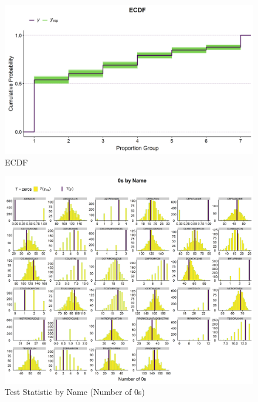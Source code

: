 \documentclass[11pt,twoside]{article}
\numberwithin{Theorem}{section}
\numberwithin{Definition}{section}
\numberwithin{Lemma}{section}
\numberwithin{Algorithm}{section}
\numberwithin{equation}{section}
\begin{document}
\begin{figure}[h!]
	\centering
	\includegraphics[height = 0.35\textheight]{Figures/4_MC41_ECDF.png}
	\caption{ECDF} \label{fig::4_MC41_ECDF}	
\end{figure}

\begin{figure}[h!]
	\centering
	\includegraphics[width = 1\textwidth, height=0.5\textheight]{Figures/4_MC41_Zeros.png}
	\caption{Test Statistic by Name (Number of 0s)} \label{fig::4_MC41_Zeros}	
\end{figure}
\end{document}

